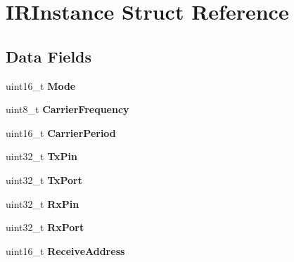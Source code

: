 \hypertarget{struct_i_r_instance}{\section{I\-R\-Instance Struct Reference}
\label{struct_i_r_instance}
}
\subsection*{Data Fields}
\begin{DoxyCompactItemize}
\item 
\hypertarget{struct_i_r_instance_a08ae347b1b1741d54a0e1472bebe0c41}{uint16\-\_\-t {\bfseries Mode}}\label{struct_i_r_instance_a08ae347b1b1741d54a0e1472bebe0c41}

\item 
\hypertarget{struct_i_r_instance_a23a3063e6f24eaca78f9e0db2f3bd07f}{uint8\-\_\-t {\bfseries Carrier\-Frequency}}\label{struct_i_r_instance_a23a3063e6f24eaca78f9e0db2f3bd07f}

\item 
\hypertarget{struct_i_r_instance_a7ce4e156e8b335f4ab8da1ab95e8bb78}{uint16\-\_\-t {\bfseries Carrier\-Period}}\label{struct_i_r_instance_a7ce4e156e8b335f4ab8da1ab95e8bb78}

\item 
\hypertarget{struct_i_r_instance_ad8db5c2b6d458ef94408fc171aa7fabc}{uint32\-\_\-t {\bfseries Tx\-Pin}}\label{struct_i_r_instance_ad8db5c2b6d458ef94408fc171aa7fabc}

\item 
\hypertarget{struct_i_r_instance_a0491d3193cddc5b568be222f147dcfcc}{uint32\-\_\-t {\bfseries Tx\-Port}}\label{struct_i_r_instance_a0491d3193cddc5b568be222f147dcfcc}

\item 
\hypertarget{struct_i_r_instance_ab9fd2a831b0252be9553645df9250c54}{uint32\-\_\-t {\bfseries Rx\-Pin}}\label{struct_i_r_instance_ab9fd2a831b0252be9553645df9250c54}

\item 
\hypertarget{struct_i_r_instance_a5202eb791e1291a983144f72a457d38d}{uint32\-\_\-t {\bfseries Rx\-Port}}\label{struct_i_r_instance_a5202eb791e1291a983144f72a457d38d}

\item 
\hypertarget{struct_i_r_instance_a76f9d50da2a9a8c4e4ee3f61e2296514}{uint16\-\_\-t {\bfseries Receive\-Address}}\label{struct_i_r_instance_a76f9d50da2a9a8c4e4ee3f61e2296514}


\end{DoxyCompactItemize}
